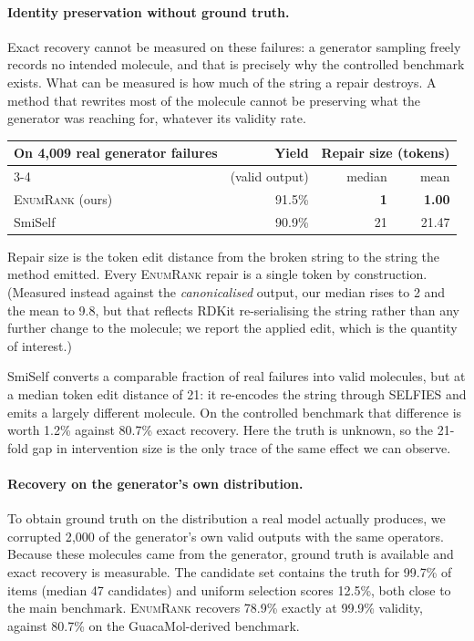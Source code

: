 \documentclass[11pt]{article}
\newcommand{\ours}{\textsc{EnumRank}}
\begin{document}
\paragraph{Identity preservation without ground truth.}
Exact recovery cannot be measured on these failures: a generator sampling
freely records no intended molecule, and that is precisely why the controlled
benchmark exists. What can be measured is how much of the string a repair destroys. A
method that rewrites most of the molecule cannot be preserving what the
generator was reaching for, whatever its validity rate.

\begin{center}\small
\begin{tabular}{lrrr}
\toprule
On 4{,}009 real generator failures & Yield & \multicolumn{2}{c}{Repair size (tokens)} \\
\cmidrule(l){3-4}
 & (valid output) & median & mean \\
\midrule
\ours{} (ours)              & 91.5\% & \textbf{1} & \textbf{1.00} \\
SmiSelf~\citep{smiself2025} & 90.9\% & 21 & 21.47 \\
\bottomrule
\end{tabular}
\end{center}

\noindent
Repair size is the token edit distance from the broken string to the string the
method emitted. Every \ours{} repair is a single token by construction.
(Measured instead against the \emph{canonicalised} output, our median rises to 2
and the mean to 9.8, but that reflects RDKit re-serialising the string rather
than any further change to the molecule; we report the applied edit, which is
the quantity of interest.)

SmiSelf converts a comparable fraction of real failures into valid molecules, but
at a median token edit distance of 21: it re-encodes the string through SELFIES
and emits a largely different molecule. On the controlled benchmark that
difference is worth 1.2\% against 80.7\% exact recovery. Here the truth is
unknown, so the 21-fold gap in intervention size is the only trace of the same
effect we can observe.

\paragraph{Recovery on the generator's own distribution.}
To obtain ground truth on the distribution a real model actually produces, we
corrupted 2{,}000 of the generator's own valid outputs with the same operators.
Because these molecules came from the generator, ground truth is available and
exact recovery is measurable. The candidate set contains the truth for 99.7\% of
items (median 47 candidates) and uniform selection scores 12.5\%, both close to
the main benchmark. \ours{} recovers 78.9\% exactly at 99.9\% validity, against
80.7\% on the GuacaMol-derived benchmark.
\end{document}
